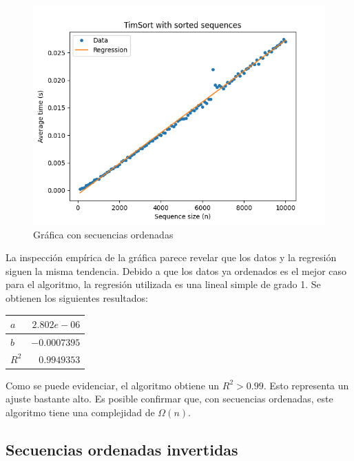\documentclass[letter]{article}
\begin{document}
\vspace{-1em}
\begin{figure}[!htb]
\centering
\includegraphics[scale=0.5]{img/plot_sorted.png}
\vspace{-1em}
\caption{Gráfica con secuencias ordenadas}
\label{fig:grafica:ordenadas}
\end{figure}

La inspección empírica de la gráfica parece revelar que los datos y la regresión siguen la misma tendencia. Debido a que los datos ya ordenados es el mejor caso para el algoritmo, la regresión utilizada es una lineal simple de grado 1. Se obtienen los siguientes resultados: \par

\begin{table}[!ht]
\begin{tabular}{|l|r|}
\hline
$a$   & $2.802e-06$ \\ \hline
$b$   & $-0.0007395$ \\ \hline
$R^2$ & $0.9949353$ \\ \hline
\end{tabular}
\end{table}

Como se puede evidenciar, el algoritmo obtiene un $R^2 > 0.99$. Esto representa un ajuste bastante alto. Es posible confirmar que, con secuencias ordenadas, este algoritmo tiene una complejidad de $\Omega (n)$.

\subsection{Secuencias ordenadas invertidas} \label{resultados:invertidas}
\end{document}
